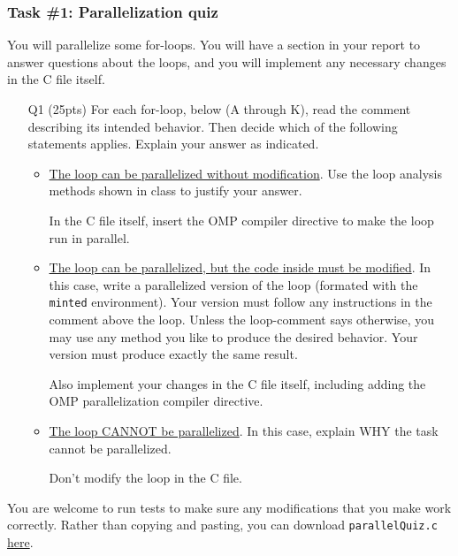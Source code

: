 \subsubsection*{Task \#1: Parallelization quiz}
You will parallelize some for-loops.
You will have a section in your report to answer questions about the loops,
and you will implement any necessary changes in the C file itself.
\begin{itemize}
    \item[Q1] (25pts) For each for-loop, below (A through K), read the comment describing its intended behavior.
    Then decide which of the following statements applies.
    Explain your answer as indicated.
    \begin{itemize}
        \item \underline{The loop can be parallelized without modification}.
        Use the loop analysis methods shown in class to justify your answer.
        
        In the C file itself, insert the OMP compiler directive to make the loop run in parallel.
        \item \underline{The loop can be parallelized, but the code inside must be modified}.
        In this case, write a parallelized version of the loop (formated with the \texttt{minted} environment).
        Your version must follow any instructions in the comment above the loop.
        Unless the loop-comment says otherwise, you may use any method you like to produce the desired behavior.
        Your version must produce exactly the same result.
        
        Also implement your changes in the C file itself, including adding the OMP parallelization compiler directive.
        \item \underline{The loop CANNOT be parallelized}.
        In this case, explain WHY the task cannot be parallelized.
        
        Don't modify the loop in the C file.
    \end{itemize}
\end{itemize}
You are welcome to run tests to make sure any modifications that you make work correctly.
Rather than copying and pasting, you can download \texttt{parallelQuiz.c} \href{https://canvas.vt.edu/files/11298897/download?download_frd=1}{here}.
\newpage
